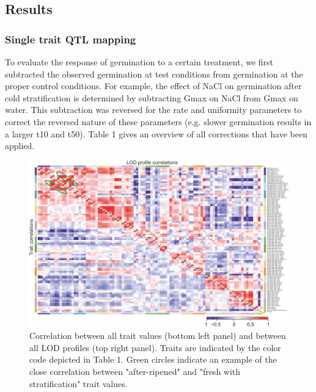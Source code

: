 \subsection{Results}

\subsubsection{Single trait QTL mapping}
To evaluate the response of germination to a certain treatment, we first subtracted the observed 
germination at test conditions from germination at the proper control conditions. For example, the 
effect of NaCl on germination after cold stratification is determined by subtracting Gmax on 
NaCl from Gmax on water. This subtraction was reversed for the rate and uniformity parameters to 
correct the reversed nature of these parameters (e.g. slower germination results in a larger t10 
and t50). Table 1 gives an overview of all corrections that have been applied. 

\begin{figure}[h!]
  \centering
  \includegraphics[keepaspectratio,scale=0.30]{eps/image_3_1_3.eps}
  \caption[Heatmap of correlation.]{Correlation between all trait values (bottom left panel) and between 
          all LOD profiles (top right panel). Traits are indicated by the color code depicted in Table 1. 
          Green circles indicate an example of the close correlation between "after-ripened" and "fresh 
          with stratification" trait values.}
\end{figure}

